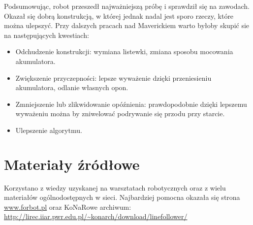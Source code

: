 \documentclass[12pt,a4paper]{article}
\begin{document}
Podsumowując, robot przeszedł najważniejszą próbę i sprawdził się na zawodach. Okazał się dobrą konstrukcją, w której jednak nadal jest sporo rzeczy, które można ulepszyć. Przy dalszych pracach nad Maverickiem warto byłoby skupić sie na następujących kwestiach:
\begin{itemize}
\item Odchudzenie konstrukcji: wymiana listewki, zmiana sposobu mocowania akumulatora.
\item Zwiększenie przyczepności: lepsze wyważenie dzięki przeniesieniu akumulatora, odlanie własnych opon.
\item Zmniejszenie lub zlikwidowanie opóźnienia: prawdopodobnie dzięki lepszemu wyważeniu można by zniwelować podrywanie się przodu przy starcie.
\item Ulepszenie algorytmu.
\end{itemize}


\section{Materiały źródłowe}
Korzystano z wiedzy uzyskanej na warsztatach robotycznych oraz z wielu materiałów ogólnodostępnych w sieci. Najbardziej pomocna okazała się strona \url{www.forbot.pl} oraz KoNaRowe archiwum: \url{http://lirec.iiar.pwr.edu.pl/~konarch/download/linefollower/}

%
%
\clearpage
\end{document}

